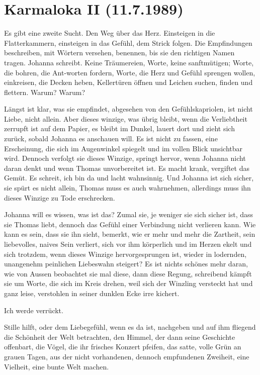 \documentclass[10pt,titlepage,a5paper]{book}
\begin{document}
\section*{Karmaloka II (11.7.1989)}



Es gibt eine zweite Sucht. Den Weg über das Herz. Einsteigen in die Flatterkammern, einsteigen in das Gefühl, dem Strick folgen. Die Empfindungen beschreiben, mit Wörtern versehen, benennen, bis sie den richtigen Namen tragen. Johanna schreibt. Keine Träu\-mereien, Worte, keine sanftmütigen; Worte, die bohren, die Ant-worten fordern, Worte, die Herz und Gefühl sprengen wollen, einkreisen, die Decken heben, Kellertüren öffnen und Leichen suchen, finden und flettern. Warum? Warum?

Längst ist klar, was sie empfindet, abgesehen von den Gefühls\-kapriolen, ist nicht Liebe, nicht allein. Aber dieses winzige, was übrig bleibt, wenn die Verliebtheit zerrupft ist auf dem Papier, es bleibt im Dunkel, lauert dort und zieht sich zurück, sobald Johanna es anschauen will. Es ist nicht zu fassen, eine Erscheinung, die sich im Augenwinkel spiegelt und im vollen Blick unsichtbar wird. Dennoch verfolgt sie dieses Winzige, springt hervor, wenn Johanna nicht daran denkt und wenn Thomas unvorbereitet ist. Es macht krank, vergiftet das Gemüt. Es schreit, ich bin da und lacht wahnsinnig. Und Johanna ist sich sicher, sie spürt es nicht allein, Thomas muss es auch wahrnehmen, allerdings muss ihn dieses Winzige zu Tode erschrecken.

Johanna will es wissen, was ist das? Zumal sie, je weniger sie sich sicher ist, dass sie Thomas liebt, dennoch das Gefühl einer Verbindung nicht verlieren kann. Wie kann es sein, dass sie ihn sieht, bemerkt, wie er mehr und mehr die Zartheit, sein liebevolles, naives Sein verliert, sich vor ihm körperlich und im Herzen ekelt und sich trotzdem, wenn dieses Winzige hervorgesprungen ist, wieder in lodernden, unangenehm peinlichen Liebeswahn steigert? Es ist nichts schönes mehr daran, wie von Aussen beobachtet sie mal diese, dann diese Regung, schreibend kämpft sie um Worte, die sich im Kreis drehen, weil sich der Winzling versteckt hat und ganz leise, verstohlen in seiner dunklen Ecke irre kichert.

Ich werde verrückt. 

Stille hilft, oder dem Liebegefühl, wenn es da ist, nachgeben und auf ihm fliegend die Schönheit der Welt betrachten, den Himmel, der dann seine Geschichte offenbart, die Vögel, die ihr frisches Konzert pfeifen, das satte, volle Grün an grauen Tagen, aus der nicht vorhandenen, dennoch empfundenen Zweiheit, eine Vielheit, eine bunte Welt machen.
\end{document}
